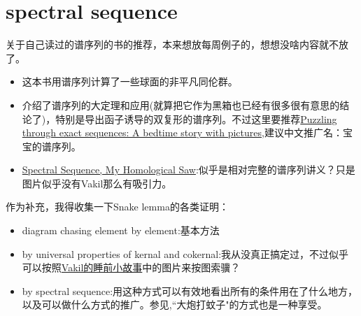 \documentclass{ctexart}
\begin{document}
\section{spectral sequence}
关于自己读过的谱序列的书的推荐，本来想放每周例子的，想想没啥内容就不放了。
\begin{itemize}
	\item \cite[Chap 3]{bott2013differential}这本书用谱序列计算了一些球面的非平凡同伦群。
	\item \cite[1.7,23.3]{vakil2017rising}介绍了谱序列的大定理和应用(就算把它作为黑箱也已经有很多很有意思的结论了)，特别是导出函子诱导的双复形的谱序列。不过这里要推荐\href{https://www.3blue1brown.com/content/blog/exact-sequence-picturebook/PuzzlingThroughExactSequences.pdf}{Puzzling through exact sequences: A bedtime story with pictures},建议中文推广名：宝宝的谱序列。
	\item \href{https://www.cnblogs.com/XiongRuiMath/p/14992978.html}{Spectral Sequence, My Homological Saw}:似乎是相对完整的谱序列讲义？只是图片似乎没有Vakil那么有吸引力。
\end{itemize}
作为补充，我得收集一下Snake lemma的各类证明：
\begin{itemize}
	\item diagram chasing element by element:基本方法
	\item by universal properties of kernal and cokernal:我从没真正搞定过，不过似乎可以按照\href{https://www.3blue1brown.com/content/blog/exact-sequence-picturebook/PuzzlingThroughExactSequences.pdf}{Vakil的睡前小故事}中的图片来按图索骥？
	\item by spectral sequence:用这种方式可以有效地看出所有的条件用在了什么地方，以及可以做什么方式的推广。参见\cite[1.7.5]{vakil2017rising},``大炮打蚊子"的方式也是一种享受。
\end{itemize}
\renewcommand\refname{{\textbf{参考文献}}}
	

\end{document}
